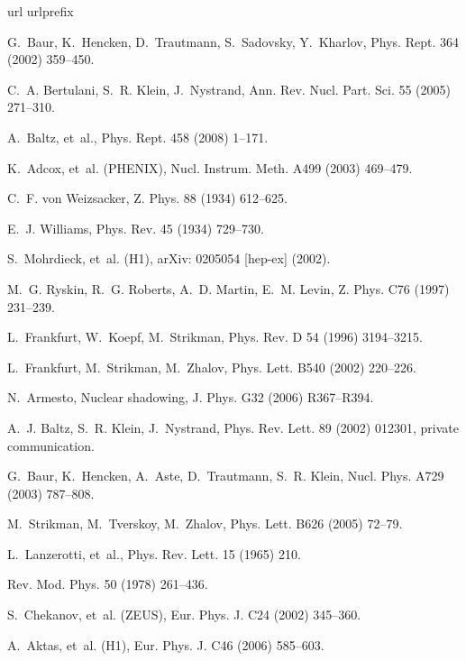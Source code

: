 \documentclass[dvipdfm]{elsart}
\begin{document}
\begin{thebibliography}{10}
\expandafter\ifx\csname url\endcsname\relax
  \def\url#1{\texttt{#1}}\fi
\expandafter\ifx\csname urlprefix\endcsname\relax\def\urlprefix{URL }\fi

G.~Baur, K.~Hencken, D.~Trautmann, S.~Sadovsky, Y.~Kharlov, Phys. Rept. 364
  (2002) 359--450.

C.~A. Bertulani, S.~R. Klein, J.~Nystrand, Ann. Rev. Nucl. Part. Sci. 55 (2005)
  271--310.

A.~Baltz, et~al., Phys. Rept. 458 (2008) 1--171.

K.~Adcox, et~al. (PHENIX), Nucl. Instrum. Meth. A499 (2003) 469--479.

C.~F. von Weizsacker, Z. Phys. 88 (1934) 612--625.

E.~J. Williams, Phys. Rev. 45 (1934) 729--730.

S.~Mohrdieck, et~al. (H1), arXiv: 0205054 [hep-ex] (2002).

M.~G. Ryskin, R.~G. Roberts, A.~D. Martin, E.~M. Levin, Z. Phys. C76 (1997)
  231--239.

L.~Frankfurt, W.~Koepf, M.~Strikman, Phys. Rev. D 54 (1996) 3194--3215.

L.~Frankfurt, M.~Strikman, M.~Zhalov, Phys. Lett. B540 (2002) 220--226.

N.~Armesto, {Nuclear shadowing}, J. Phys. G32 (2006) R367--R394.

A.~J. Baltz, S.~R. Klein, J.~Nystrand, Phys. Rev. Lett. 89 (2002) 012301,
  private communication.

G.~Baur, K.~Hencken, A.~Aste, D.~Trautmann, S.~R. Klein, Nucl. Phys. A729
  (2003) 787--808.

M.~Strikman, M.~Tverskoy, M.~Zhalov, Phys. Lett. B626 (2005) 72--79.

L.~Lanzerotti, et~al., Phys. Rev. Lett. 15 (1965) 210.

Rev. Mod. Phys. 50 (1978) 261--436.

S.~Chekanov, et~al. (ZEUS), Eur. Phys. J. C24 (2002) 345--360.

A.~Aktas, et~al. (H1), Eur. Phys. J. C46 (2006) 585--603.


\end{thebibliography}
\end{document}
